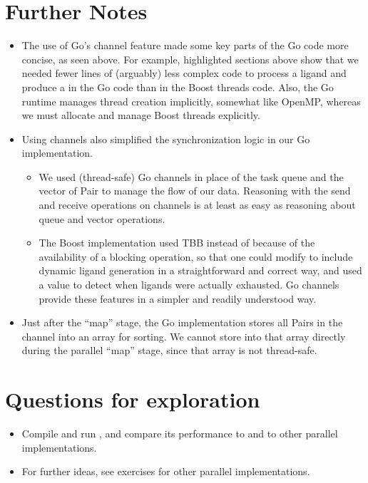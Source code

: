 \documentclass[letterpaper,10pt,openany,oneside]{sphinxmanual}
\begin{document}
\section{Further Notes}
\label{go/go:id2}\begin{itemize}
\item {} 
The use of Go’s channel feature made some key parts of the Go code more concise, as seen above. For example, highlighted sections above show that we needed fewer lines of (arguably) less complex code to process a ligand and produce a  in the Go code than in the Boost threads code. Also, the Go runtime manages thread creation implicitly, somewhat like OpenMP, whereas we must allocate and manage Boost threads explicitly.

\item {} 
Using channels also simplified the synchronization logic in our Go implementation.
\begin{itemize}
\item {} 
We used (thread-safe) Go channels in place of the task queue  and the vector of Pair  to manage the flow of our data. Reasoning with the send and receive operations on channels is at least as easy as reasoning about queue and vector operations.

\item {} 
The Boost implementation used TBB  instead of  because of the availability of a blocking  operation, so that one could modify  to include dynamic ligand generation in a straightforward and correct way, and used a value  to detect when ligands were actually exhausted. Go channels provide these features in a simpler and readily understood way.

\end{itemize}

\item {} 
Just after the “map” stage, the Go implementation stores all Pairs in the channel  into an array for sorting. We cannot store into that array directly during the parallel “map” stage, since that array is not thread-safe.

\end{itemize}


\section{Questions for exploration}
\label{go/go:id3}\begin{itemize}
\item {} 
Compile and run , and compare its performance to  and to other parallel implementations.

\item {} 
For further ideas, see exercises for other parallel implementations.

\end{itemize}
\end{document}
